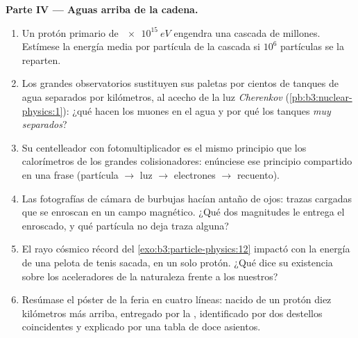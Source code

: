 \begin{problem}
\medskip\noindent\textbf{Parte IV --- Aguas arriba de la cadena.}

\begin{enumerate}[resume]
  \item Un protón primario de $\qty{e15}{eV}$ engendra una cascada de
        millones. Estímese la energía media por partícula de la cascada
        si $10^{6}$ partículas se la reparten.
  \item Los grandes observatorios sustituyen sus paletas por cientos de
        tanques de agua separados por kilómetros, al acecho de la
        luz \emph{Cherenkov} (\cref{pb:b3:nuclear-physics:1}):
        ¿qué hacen los muones en el agua y por qué los tanques \emph{muy
        separados}?
  \item Su centelleador con fotomultiplicador es el mismo
        principio que los calorímetros de los grandes colisionadores:
        enúnciese ese principio compartido en una frase
        (partícula $\to$ luz $\to$ electrones $\to$ recuento).
  \item Las fotografías de cámara de burbujas hacían antaño de ojos: trazas
        cargadas que se enroscan en un campo magnético. ¿Qué dos magnitudes
        le entrega el enroscado, y qué partícula no deja traza alguna?
  \item El rayo cósmico récord del
        \cref{exo:b3:particle-physics:12} impactó con la energía de
        una pelota de tenis sacada, en un solo protón. ¿Qué dice su
        existencia sobre los aceleradores de la naturaleza frente a los nuestros?
  \item Resúmase el póster de la feria en cuatro líneas: nacido de un
        protón diez kilómetros más arriba, entregado por la ,
        identificado por dos destellos coincidentes y explicado por una
        tabla de doce asientos.
\end{enumerate}
\end{problem}
